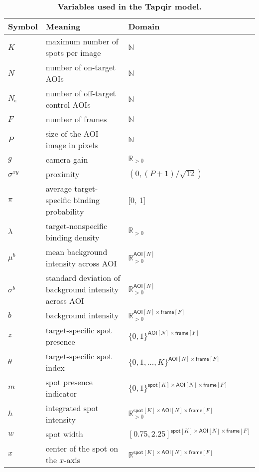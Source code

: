 \begin{table}
\caption{\label{tab:variables} \textbf{Variables used in the Tapqir model.}}
\begin{tabular}{l l l}
\toprule
Symbol & Meaning & Domain \\
\midrule
$K$ & maximum number of spots per image & $\mathbb{N}$ \\
$N$ & number of on-target AOIs & $\mathbb{N}$ \rule{0pt}{3ex} \\
$N_\mathsf{c}$ & number of off-target control AOIs & $\mathbb{N}$ \rule{0pt}{3ex} \\
$F$ & number of frames & $\mathbb{N}$ \rule{0pt}{3ex} \\
$P$ & size of the AOI image in pixels & $\mathbb{N}$ \rule{0pt}{3ex} \\
$g$ & camera gain & $\mathbb{R}_{>0}$ \rule{0pt}{3ex} \\
$\sigma^{xy}$ & proximity & $(0, (P+1)/\sqrt{12})$ \rule{0pt}{3ex} \\
$\pi$ & average target-specific binding probability & [0, 1] \rule{0pt}{3ex} \\
$\lambda$ & target-nonspecific binding density & $\mathbb{R}_{>0}$ \rule{0pt}{3ex} \\
$\mu^b$ & mean background intensity across AOI & $\mathbb{R}_{>0}^{\mathsf{AOI}[N]}$ \rule{0pt}{3ex} \\
$\sigma^b$ & standard deviation of background intensity across AOI & $\mathbb{R}_{>0}^{\mathsf{AOI}[N]}$ \rule{0pt}{3ex} \\
$b$ & background intensity & $\mathbb{R}_{>0}^{\mathsf{AOI}[N] \times \mathsf{frame}[F]}$ \rule{0pt}{3ex} \\
$z$ & target-specific spot presence & $\{0, 1\}^{\mathsf{AOI}[N] \times \mathsf{frame}[F]}$ \rule{0pt}{3ex} \\
$\theta$ & target-specific spot index & $\{0, 1, \dots, K \}^{\mathsf{AOI}[N] \times \mathsf{frame}[F]}$ \rule{0pt}{3ex} \\
$m$ & spot presence indicator & $\{ 0, 1 \}^{\mathsf{spot}[K] \times \mathsf{AOI}[N] \times \mathsf{frame}[F]}$ \rule{0pt}{3ex} \\
$h$ & integrated spot intensity & $\mathbb{R}_{>0}^{\mathsf{spot}[K] \times \mathsf{AOI}[N] \times \mathsf{frame}[F]}$ \rule{0pt}{3ex} \\
$w$ & spot width & $[0.75, 2.25]^{\mathsf{spot}[K] \times \mathsf{AOI}[N] \times \mathsf{frame}[F]}$ \rule{0pt}{3ex} \\
$x$ & center of the spot on the $x$-axis & $\mathbb{R}^{\mathsf{spot}[K] \times \mathsf{AOI}[N] \times \mathsf{frame}[F]}$ \rule{0pt}{3ex} \\

\end{tabular}
\end{table}
